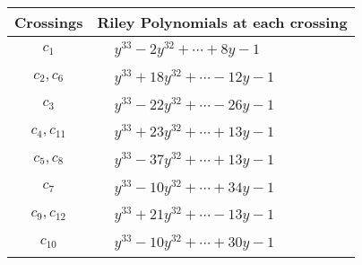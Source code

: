 \documentclass[1p]{elsarticle_modified}
\theoremstyle{definition}
\begin{document}
\begin{tabular}{m{50pt}|m{274pt}}
Crossings & \hspace{64pt}Riley Polynomials at each crossing \\
\hline $$\begin{aligned}c_{1}\end{aligned}$$&$\begin{aligned}
&y^{33}-2 y^{32}+\cdots+8 y-1
\end{aligned}$\\
\hline $$\begin{aligned}c_{2},c_{6}\end{aligned}$$&$\begin{aligned}
&y^{33}+18 y^{32}+\cdots-12 y-1
\end{aligned}$\\
\hline $$\begin{aligned}c_{3}\end{aligned}$$&$\begin{aligned}
&y^{33}-22 y^{32}+\cdots-26 y-1
\end{aligned}$\\
\hline $$\begin{aligned}c_{4},c_{11}\end{aligned}$$&$\begin{aligned}
&y^{33}+23 y^{32}+\cdots+13 y-1
\end{aligned}$\\
\hline $$\begin{aligned}c_{5},c_{8}\end{aligned}$$&$\begin{aligned}
&y^{33}-37 y^{32}+\cdots+13 y-1
\end{aligned}$\\
\hline $$\begin{aligned}c_{7}\end{aligned}$$&$\begin{aligned}
&y^{33}-10 y^{32}+\cdots+34 y-1
\end{aligned}$\\
\hline $$\begin{aligned}c_{9},c_{12}\end{aligned}$$&$\begin{aligned}
&y^{33}+21 y^{32}+\cdots-13 y-1
\end{aligned}$\\
\hline $$\begin{aligned}c_{10}\end{aligned}$$&$\begin{aligned}
&y^{33}-10 y^{32}+\cdots+30 y-1
\end{aligned}$\\
\hline
\end{tabular}\\~\\
\end{document}
